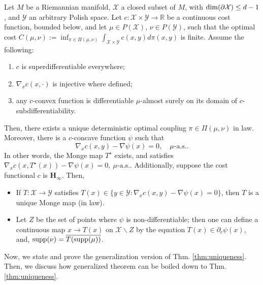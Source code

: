 \begin{lemma} \label{lemma2} 
Let $M$ be a Riemannian manifold, $\mathcal{X}$ a closed subset of $M$, with ${\rm dim} (\partial \mathcal{X}) \leq d - 1$, and $\mathcal{Y}$ an arbitrary Polish space. Let $c:\mathcal{X}\times \mathcal{Y} \rightarrow \mathbb{R}$ be a continuous cost function, bounded below, and let $\mu \in P(\mathcal{X})$, $\nu\in P(\mathcal{Y})$, such that the optimal cost $C(\mu, \nu):= \inf_{\pi \in \Pi(\mu, \nu)} \int_{\mathcal{X}\times\mathcal{Y}} c(x,y) d\pi(x,y)$ is finite. Assume the following:
\begin{enumerate}[label=(\roman*)]
    \item $c$ is superdifferentiable everywhere;
    \item $\nabla_x c(x,\cdot)$ is injective where defined;
    \item any $c$-convex function is differentiable $\mu$-almost surely on its domain of $c$-subdifferentiability.
\end{enumerate}
Then, there exists a unique deterministic optimal coupling $\pi \in \Pi(\mu, \nu)$ in law. Moreover, there is a $c$-concave function $\psi$ such that 
\begin{equation} \label{eq:gradient_optimality}
    \nabla_x c(x,y) - \nabla \psi (x) = 0, \quad \mu \text{-a.s..}
\end{equation}
In other words, the Monge map $T^\star$ exists, and satisfies $\nabla_x c(x,T^\star(x)) - \nabla \psi (x) = 0, \ \mu \text{-a.s..}$
Additionally, suppose the cost functional $c$ is $\mathbf{H_\infty}$. Then,
\begin{itemize}
    \item If $T:\mathcal{X}\rightarrow \mathcal{Y}$ satisfies $T(x) \in \{ y\in \mathcal{Y} : \nabla_x c(x,y) - \nabla \psi (x) = 0  \}$, then $T$ is a unique Monge map (in law).
    \item Let $Z$ be the set of points where $\psi$ is non-differentiable; then one can define a continuous map $x\rightarrow T(x)$ on $\mathcal{X}\backslash Z$ by the equation $T(x)\in \partial_c \psi(x)$, and, ${\rm supp}(\nu) = \overline{T({\rm supp} (\mu) )}$.
\end{itemize}
\end{lemma}


Now, we state and prove the generalization version of Thm. \ref{thm:uniqueness}.
Then, we discuss how generalized theorem can be boiled down to Thm. \ref{thm:uniqueness}.

